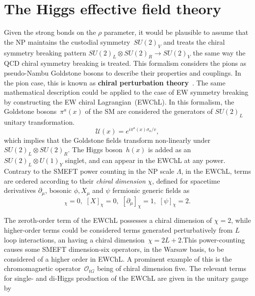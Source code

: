\section{The Higgs effective field theory\label{sec:chiral}}
Given the strong bonds on the $\rho$ parameter, it would be plausible to assume that the NP maintains the custodial symmetry~$SU(2)_V$ and treats the chiral symmetry breaking pattern $SU(2)_L \otimes SU(2)_R \to SU(2)_V$  the same way the QCD chiral symmetry breaking is treated. This formalism considers the pions as pseudo-Nambu Goldstone bosons to describe their properties and couplings. In the pion case, this is known as \textbf{chiral perturbation theory}~\cite{GASSER1984142, GASSER1985465}. The same mathematical description could be applied to the case of EW symmetry breaking by constructing the EW chiral Lagrangian~(EWChL).   In this formalism, the Goldstone bosons~$\pi^a(x)$ of the SM are considered the generators of $SU(2)_L$ unitary transformation.
\begin{equation}
	\mathcal U(x) = e^{ i \pi^a(x)\sigma_a/v }, 
\end{equation}
which implies that the Goldstone fields transform non-linearly under~$SU(2)_L \otimes SU(2)_R$.  The Higgs boson~$h(x)$ is added as an $SU(2)_L \otimes U(1)_Y$ singlet, and can appear in the EWChL at any power. Contrary to the SMEFT power counting in the NP scale $ \Lambda$, in the EWChL, terms are ordered according to their \emph{chiral dimension} $\chi$, defined for spacetime derivatives $\partial_\mu$,  bosonic $\phi, X_\mu$ and $\psi$ fermionic generic fields as~\cite{Buchalla:2013rka,Buchalla:2015wfa}
\begin{equation}
	[\phi]_\chi =0,\,\, [X]_\chi =0,\,\, [\partial_\mu ]_\chi =1, \,\, [\psi]_\chi =2.
\end{equation}
 \par The zeroth-order term of the EWChL possesses a chiral dimension of $\chi=2$, while higher-order terms could be considered terms generated perturbatively from $L$ loop interactions, an having a chiral dimension~$\chi= 2L+2$.This power-counting causes some SMEFT dimension-six operators, in the Warsaw basis, to be considered of a higher order in EWChL. A prominent example of this is the chromomagnetic operator~$\mathcal O_{tG}$ being of chiral dimension five. 
The relevant terms for single- and di-Higgs production of the EWChL are given in the unitary gauge by~\cite{LHCHiggsCrossSectionWorkingGroup:2016ypw,DiVita:2017eyz}
